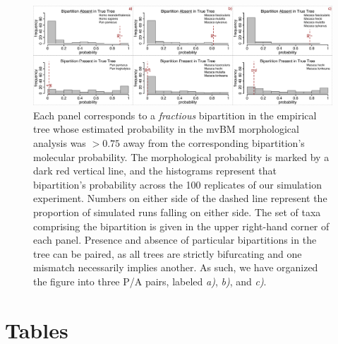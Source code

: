 \begin{figure}[h]
\centering
\includegraphics[width=160mm]{figures/harvati_figure6_final_redo.pdf}
\caption[Querying the Simulation Experiment for Concordance in Phylogenetic Error]{Each panel corresponds to a \textit{fractious} bipartition in the empirical tree whose estimated probability in the mvBM morphological analysis was $>0.75$ away from the corresponding bipartition's molecular probability. The morphological probability is marked by a dark red vertical line, and the histograms represent that bipartition's probability across the 100 replicates of our simulation experiment. Numbers on either side of the dashed line represent the proportion of simulated runs falling on either side. The set of taxa comprising the bipartition is given in the upper right-hand corner of each panel. Presence and absence of particular bipartitions in the tree can be paired, as all trees are strictly bifurcating and one mismatch necessarily implies another. As such, we have organized the figure into three P/A pairs, labeled \textit{a)}, \textit{b)}, and \textit{c)}. \label{overflow}
\label{fig:harvatiFigure6}}
\end{figure}



\clearpage

\section{Tables}


